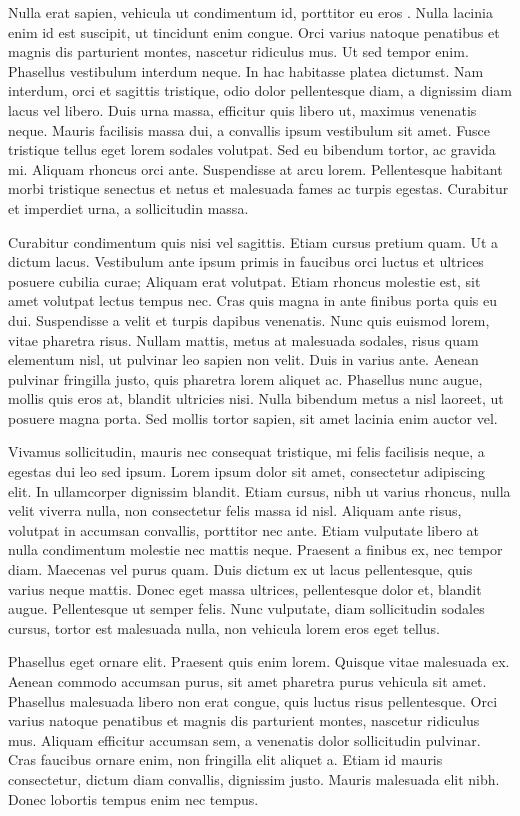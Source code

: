 Nulla erat sapien, vehicula ut condimentum id, porttitor eu eros \citet{B2FH}. Nulla lacinia enim id est suscipit, ut tincidunt enim congue. Orci varius natoque penatibus et magnis dis parturient montes, nascetur ridiculus mus. Ut sed tempor enim. Phasellus vestibulum interdum neque. In hac habitasse platea dictumst. Nam interdum, orci et sagittis tristique, odio dolor pellentesque diam, a dignissim diam lacus vel libero. Duis urna massa, efficitur quis libero ut, maximus venenatis neque. Mauris facilisis massa dui, a convallis ipsum vestibulum sit amet. Fusce tristique tellus eget lorem sodales volutpat. Sed eu bibendum tortor, ac gravida mi. Aliquam rhoncus orci ante. Suspendisse at arcu lorem. Pellentesque habitant morbi tristique senectus et netus et malesuada fames ac turpis egestas. Curabitur et imperdiet urna, a sollicitudin massa.

Curabitur condimentum quis nisi vel sagittis. Etiam cursus pretium quam. Ut a dictum lacus. Vestibulum ante ipsum primis in faucibus orci luctus et ultrices posuere cubilia curae; Aliquam erat volutpat. Etiam rhoncus molestie est, sit amet volutpat lectus tempus nec. Cras quis magna in ante finibus porta quis eu dui. Suspendisse a velit et turpis dapibus venenatis. Nunc quis euismod lorem, vitae pharetra risus. Nullam mattis, metus at malesuada sodales, risus quam elementum nisl, ut pulvinar leo sapien non velit. Duis in varius ante. Aenean pulvinar fringilla justo, quis pharetra lorem aliquet ac. Phasellus nunc augue, mollis quis eros at, blandit ultricies nisi. Nulla bibendum metus a nisl laoreet, ut posuere magna porta. Sed mollis tortor sapien, sit amet lacinia enim auctor vel.

Vivamus sollicitudin, mauris nec consequat tristique, mi felis facilisis neque, a egestas dui leo sed ipsum. Lorem ipsum dolor sit amet, consectetur adipiscing elit. In ullamcorper dignissim blandit. Etiam cursus, nibh ut varius rhoncus, nulla velit viverra nulla, non consectetur felis massa id nisl. Aliquam ante risus, volutpat in accumsan convallis, porttitor nec ante. Etiam vulputate libero at nulla condimentum molestie nec mattis neque. Praesent a finibus ex, nec tempor diam. Maecenas vel purus quam. Duis dictum ex ut lacus pellentesque, quis varius neque mattis. Donec eget massa ultrices, pellentesque dolor et, blandit augue. Pellentesque ut semper felis. Nunc vulputate, diam sollicitudin sodales cursus, tortor est malesuada nulla, non vehicula lorem eros eget tellus.

Phasellus eget ornare elit. Praesent quis enim lorem. Quisque vitae malesuada ex. Aenean commodo accumsan purus, sit amet pharetra purus vehicula sit amet. Phasellus malesuada libero non erat congue, quis luctus risus pellentesque. Orci varius natoque penatibus et magnis dis parturient montes, nascetur ridiculus mus. Aliquam efficitur accumsan sem, a venenatis dolor sollicitudin pulvinar. Cras faucibus ornare enim, non fringilla elit aliquet a. Etiam id mauris consectetur, dictum diam convallis, dignissim justo. Mauris malesuada elit nibh. Donec lobortis tempus enim nec tempus.
